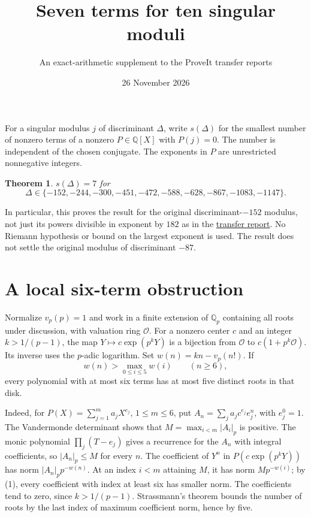 \documentclass[11pt]{article}
\title{\bfseries Seven terms for ten singular moduli}
\author{An exact-arithmetic supplement to the ProveIt transfer reports}
\date{26 November 2026}
\newtheorem{theorem}{Theorem}
\newcommand{\Q}{\mathbb Q}
\newcommand{\vp}{v_p}
\begin{document}
\maketitle
\noindent
For a singular modulus $j$ of discriminant $\Delta$, write $s(\Delta)$ for
the smallest number of nonzero terms of a nonzero $P\in\Q[X]$ with $P(j)=0$.
The number is independent of the chosen conjugate. The exponents in $P$
are unrestricted nonnegative integers.

\begin{theorem}
$s(\Delta)=7$ for
\[
 \Delta\in\{-152,-244,-300,-451,-472,-588,-628,-867,-1083,-1147\}.
\]
\end{theorem}
\noindent
In particular, this proves the result for the original discriminant-$-152$
modulus, not just its powers divisible in exponent by $182$ as in the
\href{https://chatgpt.com/c/6b07cfad-a4b4-83e8-add3-8b154f1a8176?messageId=77e95482-c17b-54ea-bd2e-3033fb0d7dfa}{transfer report}.
No Riemann hypothesis or bound on the largest exponent is used. The result
does not settle the original modulus of discriminant $-87$.

\section*{A local six-term obstruction}
Normalize $\vp(p)=1$ and work in a finite extension of $\Q_p$ containing all
roots under discussion, with valuation ring $\mathcal O$. For a nonzero center
$c$ and an integer $k>1/(p-1)$, the map $Y\mapsto c\exp(p^kY)$ is a bijection
from $\mathcal O$ to $c(1+p^k\mathcal O)$. Its inverse uses the $p$-adic
logarithm. Set $w(n)=kn-\vp(n!)$. If
\[
             w(n)>\max_{0\le i\le5}w(i) \qquad(n\ge6),
             \tag{1}
\]
every polynomial with at most six terms has at most five distinct roots
in that disk.

Indeed, for $P(X)=\sum_{j=1}^m a_jX^{e_j}$, $1\le m\le6$, put
$A_n=\sum_j a_jc^{e_j}e_j^n$, with $e_j^0=1$. The Vandermonde determinant
shows that $M=\max_{i<m}|A_i|_p$ is positive. The monic polynomial
$\prod_j(T-e_j)$ gives a recurrence for the $A_n$ with integral coefficients,
so $|A_n|_p\le M$ for every $n$. The coefficient of $Y^n$ in
$P(c\exp(p^kY))$ has norm $|A_n|_p p^{-w(n)}$. At an index $i<m$ attaining
$M$, it has norm $M p^{-w(i)}$; by (1), every coefficient with index
at least six has smaller norm. The coefficients tend to zero, since
$k>1/(p-1)$. Strassmann's theorem bounds the number of roots by the
last index of maximum coefficient norm, hence by five.
\end{document}
